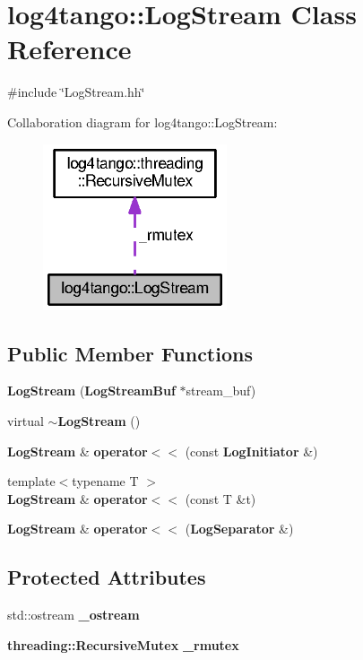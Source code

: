 \section{log4tango\-:\-:Log\-Stream Class Reference}
\label{classlog4tango_1_1LogStream}


{\ttfamily \#include \char`\"{}Log\-Stream.\-hh\char`\"{}}



Collaboration diagram for log4tango\-:\-:Log\-Stream\-:
\nopagebreak
\begin{figure}[H]
\begin{center}
\leavevmode
\includegraphics[width=154pt]{d1/d6e/classlog4tango_1_1LogStream__coll__graph}
\end{center}
\end{figure}
\subsection*{Public Member Functions}
\begin{DoxyCompactItemize}
\item 
{\bf Log\-Stream} ({\bf Log\-Stream\-Buf} $\ast$stream\-\_\-buf)
\item 
virtual {\bf $\sim$\-Log\-Stream} ()
\item 
{\bf Log\-Stream} \& {\bf operator$<$$<$} (const {\bf Log\-Initiator} \&)
\item 
{\footnotesize template$<$typename T $>$ }\\{\bf Log\-Stream} \& {\bf operator$<$$<$} (const T \&t)
\item 
{\bf Log\-Stream} \& {\bf operator$<$$<$} ({\bf Log\-Separator} \&)
\end{DoxyCompactItemize}
\subsection*{Protected Attributes}
\begin{DoxyCompactItemize}
\item 
std\-::ostream {\bf \-\_\-ostream}
\item 
{\bf threading\-::\-Recursive\-Mutex} {\bf \-\_\-rmutex}
\end{DoxyCompactItemize}



